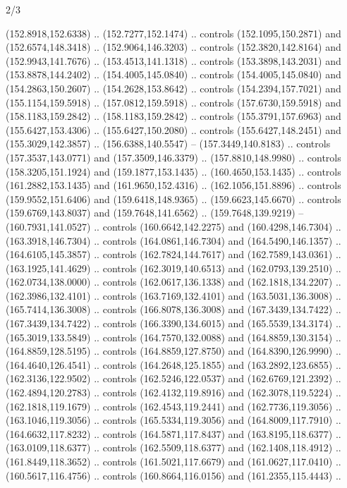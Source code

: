 \begin{flagdescription}{2/3}
\begin{scope}[xshift=0.5\flaglength,yshift=0.5\flagwidth,scale=\flagwidth/180]
\begin{scope}[y=0.8pt, x=0.8pt, yscale=-1,shift={(-168.75,-108.75)}]
  (152.8918,152.6338) .. (152.7277,152.1474) .. controls (152.1095,150.2871) and
  (152.6574,148.3418) .. (152.9064,146.3203) .. controls (152.3820,142.8164) and
  (152.9943,141.7676) .. (153.4513,141.1318) .. controls (153.3898,143.2031) and
  (153.8878,144.2402) .. (154.4005,145.0840) .. controls (154.4005,145.0840) and
  (154.2863,150.2607) .. (154.2628,153.8642) .. controls (154.2394,157.7021) and
  (155.1154,159.5918) .. (157.0812,159.5918) .. controls (157.6730,159.5918) and
  (158.1183,159.2842) .. (158.1183,159.2842) .. controls (155.3791,157.6963) and
  (155.6427,153.4306) .. (155.6427,150.2080) .. controls (155.6427,148.2451) and
  (155.3029,142.3857) .. (156.6388,140.5547) -- (157.3449,140.8183) .. controls
  (157.3537,143.0771) and (157.3509,146.3379) .. (157.8810,148.9980) .. controls
  (158.3205,151.1924) and (159.1877,153.1435) .. (160.4650,153.1435) .. controls
  (161.2882,153.1435) and (161.9650,152.4316) .. (162.1056,151.8896) .. controls
  (159.9552,151.6406) and (159.6418,148.9365) .. (159.6623,145.6670) .. controls
  (159.6769,143.8037) and (159.7648,141.6562) .. (159.7648,139.9219) --
  (160.7931,141.0527) .. controls (160.6642,142.2275) and (160.4298,146.7304) ..
  (163.3918,146.7304) .. controls (164.0861,146.7304) and (164.5490,146.1357) ..
  (164.6105,145.3857) .. controls (162.7824,144.7617) and (162.7589,143.0361) ..
  (163.1925,141.4629) .. controls (162.3019,140.6513) and (162.0793,139.2510) ..
  (162.0734,138.0000) .. controls (162.0617,136.1338) and (162.1818,134.2207) ..
  (162.3986,132.4101) .. controls (163.7169,132.4101) and (163.5031,136.3008) ..
  (165.7414,136.3008) .. controls (166.8078,136.3008) and (167.3439,134.7422) ..
  (167.3439,134.7422) .. controls (166.3390,134.6015) and (165.5539,134.3174) ..
  (165.3019,133.5849) .. controls (164.7570,132.0088) and (164.8859,130.3154) ..
  (164.8859,128.5195) .. controls (164.8859,127.8750) and (164.8390,126.9990) ..
  (164.4640,126.4541) .. controls (164.2648,125.1855) and (163.2892,123.6855) ..
  (162.3136,122.9502) .. controls (162.5246,122.0537) and (162.6769,121.2392) ..
  (162.4894,120.2783) .. controls (162.4132,119.8916) and (162.3078,119.5224) ..
  (162.1818,119.1679) .. controls (162.4543,119.2441) and (162.7736,119.3056) ..
  (163.1046,119.3056) .. controls (165.5334,119.3056) and (164.8009,117.7910) ..
  (164.6632,117.8232) .. controls (164.5871,117.8437) and (163.8195,118.6377) ..
  (163.0109,118.6377) .. controls (162.5509,118.6377) and (162.1408,118.4912) ..
  (161.8449,118.3652) .. controls (161.5021,117.6679) and (161.0627,117.0410) ..
  (160.5617,116.4756) .. controls (160.8664,116.0156) and (161.2355,115.4443) ..

\end{scope}
\end{scope}
\end{flagdescription}

